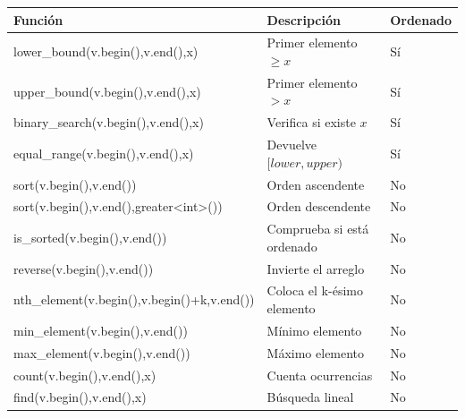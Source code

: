 {
\setlength{\LTleft}{0pt}
\setlength{\LTright}{0pt}
\begin{longtable}{@{}>{\ttfamily}p{6.8cm} p{3.8cm} p{1cm}@{} }
\toprule
Función & Descripción & Ordenado \\
\midrule
\endhead

lower\_bound(v.begin(),v.end(),x) & Primer elemento $\ge x$ & Sí\\

upper\_bound(v.begin(),v.end(),x) & Primer elemento $>x$ & Sí\\

binary\_search(v.begin(),v.end(),x) & Verifica si existe $x$ & Sí\\

equal\_range(v.begin(),v.end(),x) & Devuelve $[lower,upper)$ & Sí\\

sort(v.begin(),v.end()) & Orden ascendente & No\\

sort(v.begin(),v.end(),greater<int>()) & Orden descendente & No\\

is\_sorted(v.begin(),v.end()) & Comprueba si está ordenado & No\\

reverse(v.begin(),v.end()) & Invierte el arreglo & No\\

nth\_element(v.begin(),v.begin()+k,v.end()) & Coloca el k-ésimo elemento & No\\

min\_element(v.begin(),v.end()) & Mínimo elemento & No\\

max\_element(v.begin(),v.end()) & Máximo elemento & No\\

count(v.begin(),v.end(),x) & Cuenta ocurrencias & No\\

find(v.begin(),v.end(),x) & Búsqueda lineal & No\\

\bottomrule
\end{longtable}
}